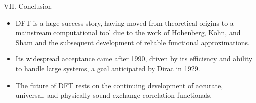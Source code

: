 \begin{frame}{\large VII. Conclusion}
    \begin{itemize}
        \item DFT is a huge success story, having moved from theoretical origins to a mainstream computational tool due to the work of Hohenberg, Kohn, and Sham and the subsequent development of reliable functional approximations.
        \item Its widespread acceptance came after 1990, driven by its efficiency and ability to handle large systems, a goal anticipated by Dirac in 1929.
        \item The future of DFT rests on the continuing development of accurate, universal, and physically sound exchange-correlation functionals.
    \end{itemize}
\end{frame}
